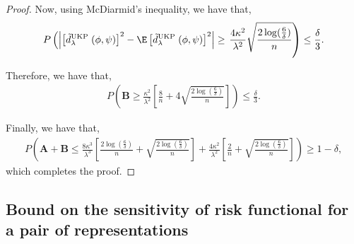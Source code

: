 \documentclass{article} %
\newcommand{\repone}{\phi}
\newcommand{\reptwo}{\psi}
\newcommand{\metricstname}{UKP }
\theoremstyle{plain}
\begin{document}
\begin{proof}
Now, using McDiarmid's inequality, we have that,
\[
\begin{aligned}
    P\left(\left|\left[\tilde{d}_{\lambda}^{\text{\metricstname}}(\repone,\reptwo)\right]^{2} - \E\left[\tilde{d}_{\lambda}^{\text{\metricstname}}(\repone,\reptwo)\right]^{2}\right|\geq \right. \left.\frac{4\kappa^{2}}{\lambda^{2}}\sqrt{\frac{2\log(\frac{6}{\delta})}{n}}\right)\leq \frac{\delta}{3}.
\end{aligned}
\]

Therefore, we have that,
\[
\begin{aligned}
    P\left(\mathbf{B} \geq \frac{\kappa^{2}}{\lambda^{2}}\left[\frac{8}{n} + 4\sqrt{\frac{2\log(\frac{6}{\delta})}{n}}\right]\right) \leq \frac{\delta}{3}.
\end{aligned}
\]

Finally, we have that,
\[
\begin{aligned}
P\left(\mathbf{A}+\mathbf{B} \leq \frac{8\kappa^{3}}{\lambda^{3}}\left[\frac{2\log(\frac{6}{\delta})}{n} + \sqrt{\frac{2\log(\frac{6}{\delta})}{n}}\right] + \frac{4\kappa^{2}}{\lambda^{2}}\left[\frac{2}{n} + \sqrt{\frac{2\log(\frac{6}{\delta})}{n}}\right]\right)
\geq 1-\delta,
\end{aligned}
\]
which completes the proof.
\end{proof}
\subsection{Bound on the sensitivity of risk functional for a pair of representations}
\end{document}
